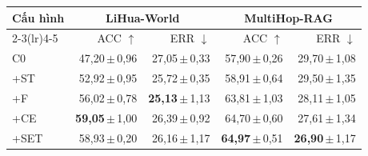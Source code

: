\begin{tabular*}{\linewidth}{@{\extracolsep{\fill}}lrrrr@{}}\toprule
\textbf{Cấu hình} & \multicolumn{2}{c}{\textbf{LiHua-World}} & \multicolumn{2}{c}{\textbf{MultiHop-RAG}}\\
\cmidrule(lr){2-3}\cmidrule(lr){4-5}
 & ACC $\uparrow$ & ERR $\downarrow$ & ACC $\uparrow$ & ERR $\downarrow$\\\midrule
C0 & 47,20\,$\pm$\,0,96 & 27,05\,$\pm$\,0,33 & 57,90\,$\pm$\,0,26 & 29,70\,$\pm$\,1,08\\
+ST & 52,92\,$\pm$\,0,95 & 25,72\,$\pm$\,0,35 & 58,91\,$\pm$\,0,64 & 29,50\,$\pm$\,1,35\\
+F & 56,02\,$\pm$\,0,78 & \textbf{25,13}\,$\pm$\,1,13 & 63,81\,$\pm$\,1,03 & 28,11\,$\pm$\,1,05\\
+CE & \textbf{59,05}\,$\pm$\,1,00 & 26,39\,$\pm$\,0,92 & 64,70\,$\pm$\,0,60 & 27,61\,$\pm$\,1,34\\
+SET & 58,93\,$\pm$\,0,20 & 26,16\,$\pm$\,1,17 & \textbf{64,97}\,$\pm$\,0,51 & \textbf{26,90}\,$\pm$\,1,17\\
\bottomrule\end{tabular*}
